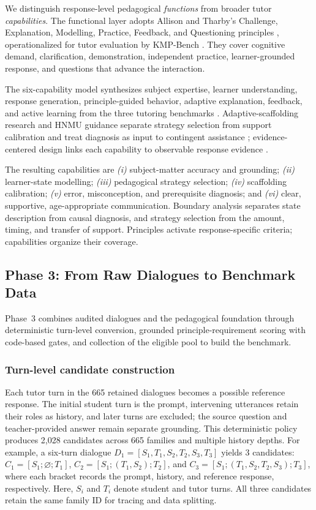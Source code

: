 \documentclass[conference]{IEEEtran}
\begin{document}
We distinguish response-level pedagogical \emph{functions} from broader
tutor \emph{capabilities}. The functional layer adopts Allison and Tharby's
Challenge, Explanation, Modelling, Practice, Feedback, and Questioning
principles \cite{allison2015making}, operationalized for tutor evaluation by
KMP-Bench \cite{shi2026kmpbench}. They cover cognitive demand, clarification,
demonstration, independent practice, learner-grounded response, and questions
that advance the interaction.

The six-capability model synthesizes subject expertise, learner
understanding, response generation, principle-guided behavior, adaptive
explanation, feedback, and active learning from the three tutoring benchmarks
\cite{macina2025mathtutorbench,shi2026kmpbench,srinivasa2025tutorbench}.
Adaptive-scaffolding research \cite{vandepol2010scaffolding} and HNMU guidance separate strategy selection
from support calibration and treat diagnosis as input to contingent assistance
; evidence-centered design links each capability
to observable response evidence \cite{mislevy2003ecd}.

The resulting capabilities are \textit{(i)} subject-matter accuracy and
grounding; \textit{(ii)} learner-state modelling; \textit{(iii)} pedagogical
strategy selection; \textit{(iv)} scaffolding calibration; \textit{(v)} error,
misconception, and prerequisite diagnosis; and \textit{(vi)} clear,
supportive, age-appropriate communication. Boundary analysis separates state
description from causal diagnosis, and strategy selection from the amount,
timing, and transfer of support. Principles activate response-specific
criteria; capabilities organize their coverage.

\subsection{Phase 3: From Raw Dialogues to Benchmark Data}

Phase~3 combines audited dialogues and the pedagogical foundation through
deterministic turn-level conversion, grounded principle-requirement scoring
with code-based gates, and collection of the eligible pool to build the benchmark.

\subsubsection{Turn-level candidate construction}
Each tutor turn in the 665 retained dialogues becomes a possible reference
response. The initial student turn is the prompt, intervening utterances retain
their roles as history, and later turns are excluded; the source question and
teacher-provided answer remain separate grounding. This deterministic policy
produces 2,028 candidates across 665 families and multiple history depths. For
example, a six-turn dialogue
\(D_1 = [S_1,T_1,S_2,T_2,S_3,T_3]\) yields 3 candidates:
\(C_1=[S_1;\varnothing;T_1]\),
\(C_2=[S_1;(T_1,S_2);T_2]\), and
\(C_3=[S_1;(T_1,S_2,T_2,S_3);T_3]\), where each bracket records the prompt,
history, and reference response, respectively. Here, \(S_i\) and \(T_i\)
denote student and tutor turns. All three candidates retain the same family ID
for tracing and data splitting.
\end{document}
